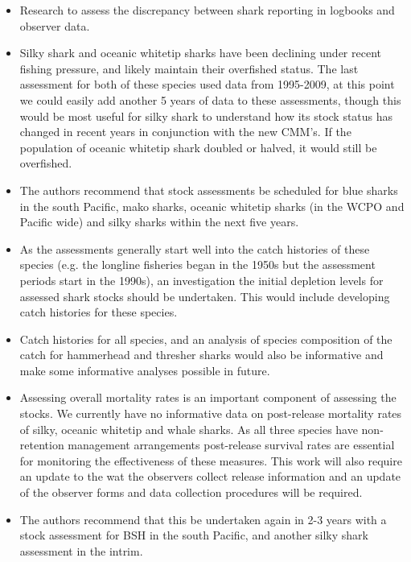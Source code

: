 \documentclass[12pt]{SCreport}
\begin{document}
 \begin{itemize}
\item Research to assess the discrepancy between shark reporting in logbooks and observer data.  
\item Silky shark and oceanic whitetip sharks have been declining under recent fishing pressure, and likely maintain their overfished status. The last assessment for both of these species used data from 1995-2009, at this point we could easily add another 5 years of data to these assessments, though this would be most useful for silky shark to understand how its stock status has changed in recent years in conjunction with the new CMM's. If the population of oceanic whitetip shark doubled or halved, it would still be overfished.
\item The authors recommend that stock assessments be scheduled for blue sharks in the south Pacific, mako sharks, oceanic whitetip sharks (in the WCPO and Pacific wide) and silky sharks within the next five years.   
\item As the assessments generally start well into the catch histories of these species (e.g. the longline fisheries began in the 1950s but the assessment periods start in the 1990s), an investigation the initial depletion levels for assessed shark stocks should be undertaken. This would include developing catch histories for these species. 
\item Catch histories for all species, and an analysis of species composition of the catch for hammerhead and thresher sharks would also be informative and make some informative analyses possible in future. 
\item Assessing overall mortality rates is an important component of assessing the stocks. We currently have no informative data on post-release mortality rates of silky, oceanic whitetip and whale sharks. As all three species have non-retention management arrangements post-release survival rates are essential for monitoring the effectiveness of these measures. This work will also require an update to the wat the observers collect release information and an update of the observer forms and data collection procedures will be required. 

\item The authors recommend that this be undertaken again in 2-3 years with a stock assessment for BSH in the south Pacific, and another silky shark assessment in the intrim. 




\end{itemize}
\end{document}
